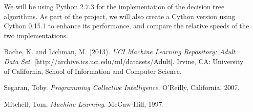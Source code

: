 \documentclass{article}
\begin{document}
We will be using Python 2.7.3 for the implementation of the decision tree algorithms. As part of the project, we will also create a Cython version using Cython 0.15.1 to enhance its performance, and compare the relative speeds of the two implementations.

\begin{thebibliography}{9}

Bache, K. and Lichman, M. (2013). \textsl{UCI Machine Learning Repository: Adult Data Set}. [http://archive.ics.uci.edu/ml/datasets/Adult]. Irvine, CA: University of California, School of Information and Computer Science.

Segaran, Toby. \textsl{Programming Collective Intelligence}. O'Reilly, California, 2007.

Mitchell, Tom. \textsl{Machine Learning}. McGaw-Hill, 1997.

\end{thebibliography}
\end{document}

